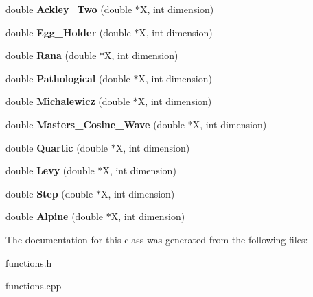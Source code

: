 \begin{DoxyCompactItemize}
double {\bfseries Ackley\+\_\+\+Two} (double $\ast$X, int dimension)
\item 
\mbox{\label{classfunctions_a06208d08c50e349055f108fb8b242a01}} 
double {\bfseries Egg\+\_\+\+Holder} (double $\ast$X, int dimension)
\item 
\mbox{\label{classfunctions_a6c22442b3fa26f6b1f6d9d23ae6102f4}} 
double {\bfseries Rana} (double $\ast$X, int dimension)
\item 
\mbox{\label{classfunctions_aa7c71412ee8deae79bad9dcc0a098b15}} 
double {\bfseries Pathological} (double $\ast$X, int dimension)
\item 
\mbox{\label{classfunctions_aea042128109cf3893c65de9402b966ce}} 
double {\bfseries Michalewicz} (double $\ast$X, int dimension)
\item 
\mbox{\label{classfunctions_a3008a09a0d34abdcb00534216027b17a}} 
double {\bfseries Masters\+\_\+\+Cosine\+\_\+\+Wave} (double $\ast$X, int dimension)
\item 
\mbox{\label{classfunctions_acc554d330b8848a23c29f2718efbd5f4}} 
double {\bfseries Quartic} (double $\ast$X, int dimension)
\item 
\mbox{\label{classfunctions_aac081448f82bfaa05fa92e7b37188e64}} 
double {\bfseries Levy} (double $\ast$X, int dimension)
\item 
\mbox{\label{classfunctions_a9d7e0c3e9f0fbb3acef497fc9e6e68e7}} 
double {\bfseries Step} (double $\ast$X, int dimension)
\item 
\mbox{\label{classfunctions_a757a7d37a218dc41c708b48f3bf57c38}} 
double {\bfseries Alpine} (double $\ast$X, int dimension)
\end{DoxyCompactItemize}


The documentation for this class was generated from the following files\+:\begin{DoxyCompactItemize}
\item 
functions.\+h\item 
functions.\+cpp\end{DoxyCompactItemize}
